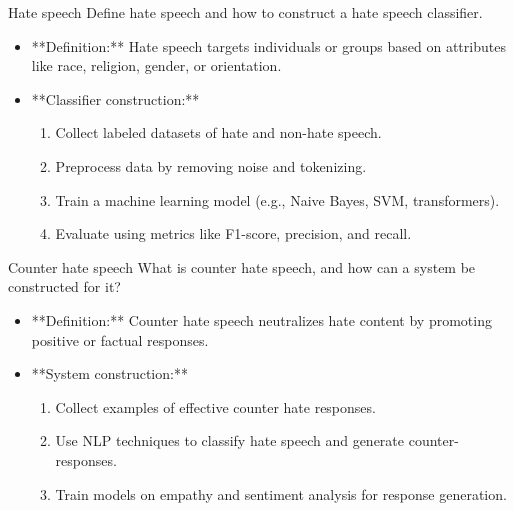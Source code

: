 \documentclass{article}
\begin{document}
\begin{exercise}{Hate speech}
  Define hate speech and how to construct a hate speech classifier.

  \begin{solution}
    \begin{itemize}
        \item **Definition:** Hate speech targets individuals or groups based on attributes like race, religion, gender, or orientation.
        \item **Classifier construction:**
        \begin{enumerate}
            \item Collect labeled datasets of hate and non-hate speech.
            \item Preprocess data by removing noise and tokenizing.
            \item Train a machine learning model (e.g., Naive Bayes, SVM, transformers).
            \item Evaluate using metrics like F1-score, precision, and recall.
        \end{enumerate}
    \end{itemize}
  \end{solution}
\end{exercise}

\begin{exercise}{Counter hate speech}
  What is counter hate speech, and how can a system be constructed for it?

  \begin{solution}
    \begin{itemize}
        \item **Definition:** Counter hate speech neutralizes hate content by promoting positive or factual responses.
        \item **System construction:**
        \begin{enumerate}
            \item Collect examples of effective counter hate responses.
            \item Use NLP techniques to classify hate speech and generate counter-responses.
            \item Train models on empathy and sentiment analysis for response generation.
        \end{enumerate}
    \end{itemize}
  \end{solution}
\end{exercise}
\end{document}
